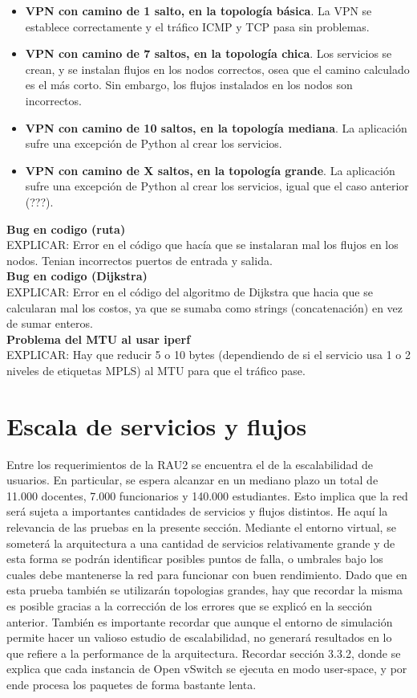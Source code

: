 \begin{itemize}
	\item \textbf{VPN con camino de 1 salto, en la topología básica}. La VPN se establece correctamente y el tráfico ICMP y TCP pasa sin problemas.
	\item \textbf{VPN con camino de 7 saltos, en la topología chica}. Los servicios se crean, y se instalan flujos en los nodos correctos, osea que el camino calculado es el más corto. Sin embargo, los flujos instalados en los nodos son incorrectos.
	\item \textbf{VPN con camino de 10 saltos, en la topología mediana}. La aplicación sufre una excepción de Python al crear los servicios.
	\item \textbf{VPN con camino de X saltos, en la topología grande}. La aplicación sufre una excepción de Python al crear los servicios, igual que el caso anterior (???).
\end{itemize}
\textbf{Bug en codigo (ruta)} \\
EXPLICAR: Error en el código que hacía que se instalaran mal los flujos en los nodos. Tenian incorrectos puertos de entrada y salida.\\
\textbf{Bug en codigo (Dijkstra)} \\
EXPLICAR: Error en el código del algoritmo de Dijkstra que hacia que se calcularan mal los costos, ya que se sumaba como strings (concatenación) en vez de sumar enteros. \\
\textbf{Problema del MTU al usar iperf} \\
EXPLICAR: Hay que reducir 5 o 10 bytes (dependiendo de si el servicio usa 1 o 2 niveles de etiquetas MPLS) al MTU para que el tráfico pase.\\

\section{Escala de servicios y flujos}
Entre los requerimientos de la RAU2 se encuentra el de la escalabilidad de usuarios. En particular, se espera alcanzar en un mediano plazo un total de 11.000 docentes, 7.000 funcionarios y 140.000 estudiantes. Esto implica que la red será sujeta a importantes cantidades de servicios y flujos distintos. He aquí la relevancia de las pruebas en la presente sección. Mediante el entorno virtual, se someterá la arquitectura a una cantidad de servicios relativamente grande y de esta forma se podrán identificar posibles puntos de falla, o umbrales bajo los cuales debe mantenerse la red para funcionar con buen rendimiento. Dado que en esta prueba también se utilizarán topologias grandes, hay que recordar la misma es posible gracias a la corrección de los errores que se explicó en la sección anterior. También es importante recordar que aunque el entorno de simulación permite hacer un valioso estudio de escalabilidad, no generará resultados en lo que refiere a la performance de la arquitectura. Recordar sección 3.3.2, donde se explica que cada instancia de Open vSwitch se ejecuta en modo user-space, y por ende procesa los paquetes de forma bastante lenta.

